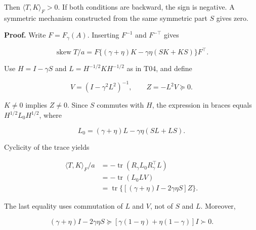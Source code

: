 \documentclass[11pt,a4paper]{article}
\begin{document}
Then \(\langle T,K\rangle_F>0\). If both conditions are backward, the
sign is negative. A symmetric mechanism constructed from the same
symmetric part \(S\) gives zero.

\par
\noindent\begin{minipage}{\linewidth}

\textbf{Proof.} Write \(F=F_\gamma(A)\). Inserting \(F^{-1}\) and
\(F^{-\top}\) gives

\[
\operatorname{skew}T/a
=F\{(\gamma+\eta)K-\gamma\eta(SK+KS)\}F^\top.
\]

\end{minipage}\par

\par
\noindent\begin{minipage}{\linewidth}

Use \(H=I-\gamma S\) and \(L=H^{-1/2}KH^{-1/2}\) as in T04, and define

\[
V=(I-\gamma^2L^2)^{-1},\qquad Z=-L^2V\succeq0.
\]

\end{minipage}\par

\(K\ne0\) implies \(Z\ne0\). Since \(S\) commutes with \(H\), the
expression in braces equals \(H^{1/2}L_0H^{1/2}\), where

\[
L_0=(\gamma+\eta)L-\gamma\eta(SL+LS).
\]

\par
\noindent\begin{minipage}{\linewidth}

Cyclicity of the trace yields

\[
\begin{aligned}
\langle T,K\rangle_F/a
&=-\operatorname{tr}(R_\gamma L_0R_\gamma^\top L)\\
&=-\operatorname{tr}(L_0LV)\\
&=\operatorname{tr}\{[(\gamma+\eta)I-2\gamma\eta S]Z\}.
\end{aligned}
\]

\end{minipage}\par

\par
\noindent\begin{minipage}{\linewidth}

The last equality uses commutation of \(L\) and \(V\), not of \(S\) and
\(L\). Moreover,

\[
(\gamma+\eta)I-2\gamma\eta S
\succeq[\gamma(1-\eta)+\eta(1-\gamma)]I\succ0.
\]

\end{minipage}\par
\end{document}
